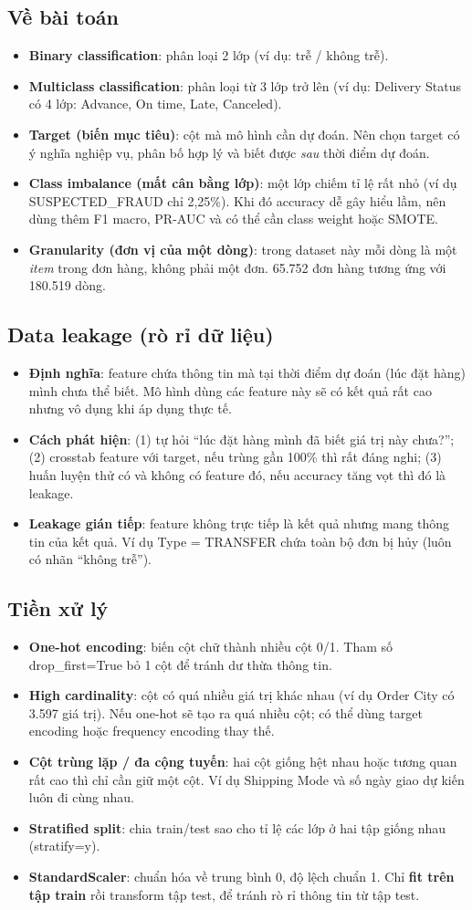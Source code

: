 \documentclass[11pt,a4paper]{article}
\newcommand{\col}[1]{\textsf{#1}}
\newcommand{\term}[2]{\item \textbf{#1}: #2}
\begin{document}
\subsection{Về bài toán}
\begin{itemize}
  \term{Binary classification}{phân loại 2 lớp (ví dụ: trễ / không trễ).}
  \term{Multiclass classification}{phân loại từ 3 lớp trở lên (ví dụ: Delivery Status có 4 lớp: Advance, On time, Late, Canceled).}
  \term{Target (biến mục tiêu)}{cột mà mô hình cần dự đoán. Nên chọn target có ý nghĩa nghiệp vụ, phân bố hợp lý và biết được \emph{sau} thời điểm dự đoán.}
  \term{Class imbalance (mất cân bằng lớp)}{một lớp chiếm tỉ lệ rất nhỏ (ví dụ SUSPECTED\_FRAUD chỉ 2,25\%). Khi đó accuracy dễ gây hiểu lầm, nên dùng thêm F1 macro, PR-AUC và có thể cần class weight hoặc SMOTE.}
  \term{Granularity (đơn vị của một dòng)}{trong dataset này mỗi dòng là một \emph{item} trong đơn hàng, không phải một đơn. 65.752 đơn hàng tương ứng với 180.519 dòng.}
\end{itemize}

\subsection{Data leakage (rò rỉ dữ liệu)}
\begin{itemize}
  \term{Định nghĩa}{feature chứa thông tin mà tại thời điểm dự đoán (lúc đặt hàng) mình chưa thể biết. Mô hình dùng các feature này sẽ có kết quả rất cao nhưng vô dụng khi áp dụng thực tế.}
  \term{Cách phát hiện}{(1) tự hỏi ``lúc đặt hàng mình đã biết giá trị này chưa?''; (2) crosstab feature với target, nếu trùng gần 100\% thì rất đáng nghi; (3) huấn luyện thử có và không có feature đó, nếu accuracy tăng vọt thì đó là leakage.}
  \term{Leakage gián tiếp}{feature không trực tiếp là kết quả nhưng mang thông tin của kết quả. Ví dụ \col{Type = TRANSFER} chứa toàn bộ đơn bị hủy (luôn có nhãn ``không trễ'').}
\end{itemize}

\subsection{Tiền xử lý}
\begin{itemize}
  \term{One-hot encoding}{biến cột chữ thành nhiều cột 0/1. Tham số \col{drop\_first=True} bỏ 1 cột để tránh dư thừa thông tin.}
  \term{High cardinality}{cột có quá nhiều giá trị khác nhau (ví dụ Order City có 3.597 giá trị). Nếu one-hot sẽ tạo ra quá nhiều cột; có thể dùng target encoding hoặc frequency encoding thay thế.}
  \term{Cột trùng lặp / đa cộng tuyến}{hai cột giống hệt nhau hoặc tương quan rất cao thì chỉ cần giữ một cột. Ví dụ Shipping Mode và số ngày giao dự kiến luôn đi cùng nhau.}
  \term{Stratified split}{chia train/test sao cho tỉ lệ các lớp ở hai tập giống nhau (\col{stratify=y}).}
  \term{StandardScaler}{chuẩn hóa về trung bình 0, độ lệch chuẩn 1. Chỉ \textbf{fit trên tập train} rồi transform tập test, để tránh rò rỉ thông tin từ tập test.}
\end{itemize}
\end{document}
